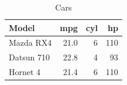 \begin{table}[ht]
\centering
\begin{tabular}{lrrr}
  \toprule
Model & mpg & cyl & hp \\ 
  \midrule
Mazda RX4 & 21.0 & 6 & 110 \\ 
  Datsun 710 & 22.8 & 4 & 93 \\ 
  Hornet 4 & 21.4 & 6 & 110 \\ 
   \bottomrule
\end{tabular}
\caption{Cars} 
\label{tab:cars}
\end{table}
